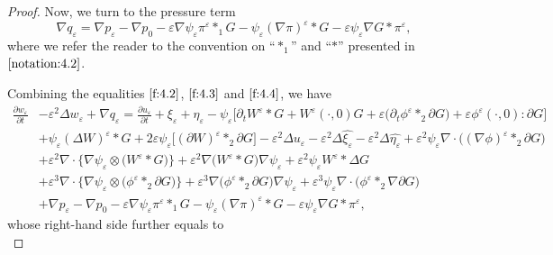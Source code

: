 \documentclass[13pt,CJK]{article}
\theoremstyle{plain}                       %
\theoremstyle{remark}
\numberwithin{equation}{section}
\begin{document}
\begin{proof}
Now, we turn to the pressure term
\begin{equation}\label{f:4.4}
\nabla q_{\varepsilon}=\nabla p_{\varepsilon}-\nabla p_0-\varepsilon\nabla\psi_{\varepsilon}
\pi^{\varepsilon}\ast_1 G
-\psi_{\varepsilon}(\nabla \pi)^{\varepsilon}\ast G
-\varepsilon\psi_{\varepsilon}
\nabla G\ast\pi^{\varepsilon},
\end{equation}
where we refer the reader to the convention on ``$\ast_1$''
and ``$\ast$'' presented in $\eqref{notation:4.2}$.

Combining the equalities $\eqref{f:4.2}$, $\eqref{f:4.3}$ and $\eqref{f:4.4}$,
we have
\begin{equation*}
\begin{aligned}
\frac{\partial w_{\varepsilon}}{\partial t}
&-\varepsilon^2\Delta w_{\varepsilon}
+\nabla q_{\varepsilon}=
\frac{\partial u_{\varepsilon}}{\partial t}
+\xi_{\varepsilon}+\eta_{\varepsilon}-
\psi_{\varepsilon}\bigg[
\partial_tW^{\varepsilon}\ast G +W^{\varepsilon}(\cdot,0)G+\varepsilon \big(\partial_t\phi^{\varepsilon}\ast_2\partial G\big)
+\varepsilon \phi^{\varepsilon}(\cdot,0):\partial G
\bigg]\\
&+\psi_{\varepsilon}(\Delta W)^{\varepsilon}\ast G
+2\varepsilon\psi_{\varepsilon}
\big[(\partial W)^{\varepsilon}\ast_2\partial G\big]
-\varepsilon^2\Delta u_{\varepsilon}
-\varepsilon^2\Delta\hat{\xi_{\varepsilon}}
-\varepsilon^2\Delta\hat{\eta_{\varepsilon}}
+\varepsilon^2\psi_{\varepsilon}
\nabla\cdot\Big(
(\nabla\phi)^{\varepsilon}\ast_2\partial G
\Big)\\
&+\varepsilon^2\nabla\cdot\bigg\{
\nabla\psi_{\varepsilon}\otimes \big(W^{\varepsilon}\ast G\big)
\bigg\}
+\varepsilon^2\nabla
\big(W^{\varepsilon}\ast G\big)\nabla\psi_{\varepsilon}
+\varepsilon^2\psi_{\varepsilon}
W^{\varepsilon}\ast\Delta G\\
&+\varepsilon^{3}\nabla\cdot
\bigg\{
\nabla\psi_{\varepsilon}\otimes
\big(\phi^{\varepsilon}\ast_2\partial G\big)
\bigg\}
+\varepsilon^3
\nabla\big(\phi^{\varepsilon}\ast_2\partial G\big)\nabla\psi_{\varepsilon}
+\varepsilon^3\psi_{\varepsilon}\nabla\cdot
\Big(\phi^{\varepsilon}\ast_2\nabla\partial G\Big)\\
&+\nabla p_{\varepsilon}
-\nabla p_0-\varepsilon
\nabla\psi_{\varepsilon}
\pi^{\varepsilon}\ast_1 G-\psi_{\varepsilon}
(\nabla \pi)^{\varepsilon}\ast G
-\varepsilon\psi_{\varepsilon}\nabla G\ast\pi^{\varepsilon},
\end{aligned}
\end{equation*}
whose right-hand side further equals to
\begin{equation*}

\end{equation*}
\end{proof}
\end{document}
